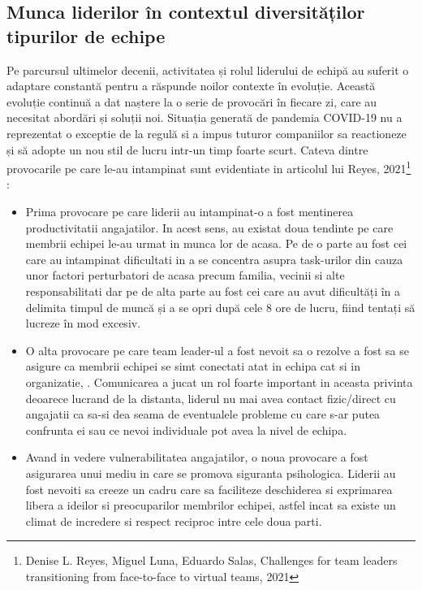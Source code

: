 \documentclass[a4paper, 12pt]{article}
\begin{document}
	\subsection{Munca liderilor în contextul diversităților tipurilor de echipe }

	\quad\quad Pe parcursul ultimelor decenii, activitatea și rolul liderului de echipă au suferit o adaptare constantă pentru a răspunde noilor contexte în evoluție. Această evoluție continuă a dat naștere la o serie de provocări în fiecare zi, care au necesitat abordări și soluții noi. Situația generată de pandemia COVID-19 nu a reprezentat o exceptie de la regulă si a impus tuturor companiilor sa  reactioneze și să adopte un nou stil de lucru intr-un timp foarte scurt. Cateva dintre provocarile pe care le-au intampinat sunt evidentiate in articolul lui Reyes, 2021\footnote{Denise L. Reyes, Miguel Luna, Eduardo Salas, Challenges for team leaders transitioning from face-to-face to virtual teams, 2021} :

	\begin{itemize}

	\item Prima provocare pe care liderii au intampinat-o a fost mentinerea productivitatii angajatilor. In acest sens, au existat doua tendinte pe care membrii echipei le-au urmat in munca lor de acasa. Pe de o parte au fost cei care au intampinat dificultati in a se concentra asupra task-urilor din cauza unor factori perturbatori de acasa precum familia, vecinii si alte responsabilitati dar pe de alta parte au fost cei care au avut dificultăți în a delimita timpul de muncă și a se opri după cele 8 ore de lucru,  fiind tentați să lucreze în mod excesiv.

	\item O alta provocare pe care team leader-ul a fost nevoit sa o rezolve a fost sa se asigure ca membrii echipei se simt conectati atat in echipa cat si in organizatie, . Comunicarea a jucat un rol foarte important in aceasta privinta deoarece lucrand de la distanta, liderul nu mai avea contact fizic/direct cu angajatii ca sa-si dea seama de eventualele probleme cu care s-ar putea confrunta ei sau ce nevoi individuale pot avea la nivel de echipa.

	\item Avand in vedere vulnerabilitatea angajatilor, o noua provocare a fost asigurarea unui mediu in care se promova siguranta psihologica. Liderii au fost nevoiti sa creeze un cadru care sa faciliteze deschiderea si exprimarea libera a ideilor si preocuparilor membrilor echipei, astfel incat sa existe un climat de incredere si respect reciproc intre cele doua parti. 


	\end{itemize}
\end{document}
